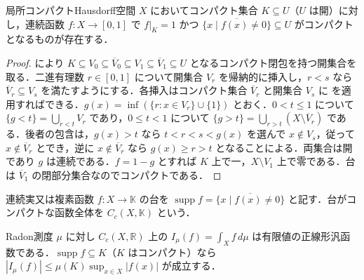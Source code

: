 \begin{prop}[コンパクト台を持つ切断函数]
局所コンパクトHausdorff空間 $X$ においてコンパクト集合 $K\subseteq U$（$U$ は開）に対し，連続函数 $f:X\to[0,1]$ で $f|_K=1$ かつ $\overline{\{x\mid f(x)\ne0\}}\subseteq U$ がコンパクトとなるものが存在する．
\end{prop}
\begin{proof}
 により $K\subseteq V_0\subseteq\overline V_0\subseteq V_1\subseteq\overline V_1\subseteq U$ となるコンパクト閉包を持つ開集合を取る．二進有理数 $r\in[0,1]$ について開集合 $V_r$ を帰納的に挿入し，$r<s$ なら $\overline V_r\subseteq V_s$ を満たすようにする．各挿入はコンパクト集合 $\overline V_r$ と開集合 $V_s$ に  を適用すればできる．$g(x)=\inf(\{r:x\in V_r\}\cup\{1\})$ とおく．$0<t\leq1$ について $\{g<t\}=\bigcup_{r<t}V_r$ であり，$0\leq t<1$ について $\{g>t\}=\bigcup_{r>t}(X\setminus\overline V_r)$ である．後者の包含は，$g(x)>t$ なら $t<r<s<g(x)$ を選んで $x\notin V_s$，従って $x\notin\overline V_r$ とでき，逆に $x\notin\overline V_r$ なら $g(x)\geq r>t$ となることによる．両集合は開であり $g$ は連続である．$f=1-g$ とすれば $K$ 上で一，$X\setminus V_1$ 上で零である．台は $\overline V_1$ の閉部分集合なのでコンパクトである．
\end{proof}
\begin{defn}[コンパクト台連続函数の空間]
連続実又は複素函数 $f:X\to\mathbb K$ の台を $\operatorname{supp}f=\overline{\{x\mid f(x)\ne0\}}$ と記す．台がコンパクトな函数全体を $C_c(X,\mathbb K)$ という．
\end{defn}
\begin{prop}[Radon測度による正線形汎函数]
Radon測度 $\mu$ に対し $C_c(X,\mathbb R)$ 上の $I_\mu(f)=\int_X f\,d\mu$ は有限値の正線形汎函数である．$\operatorname{supp}f\subseteq K$（$K$ はコンパクト）なら $|I_\mu(f)|\leq\mu(K)\sup_{x\in X}|f(x)|$ が成立する．
\end{prop}

